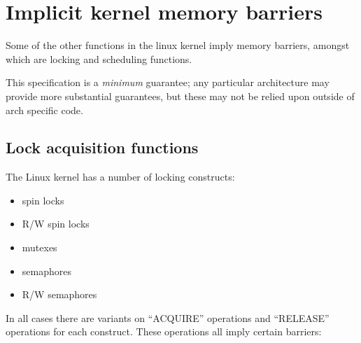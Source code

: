 \section{Implicit kernel memory barriers}

Some of the other functions in the linux kernel imply memory barriers, amongst
which are locking and scheduling functions.

This specification is a \emph{minimum} guarantee; any particular architecture
may provide more substantial guarantees, but these may not be relied upon
outside of arch specific code.


\subsection{Lock acquisition functions}

The Linux kernel has a number of locking constructs:

\begin{itemize}
 \item spin locks
 \item R/W spin locks
 \item mutexes
 \item semaphores
 \item R/W semaphores
\end{itemize}

In all cases there are variants on ``ACQUIRE'' operations and ``RELEASE'' operations
for each construct.
These operations all imply certain barriers:

